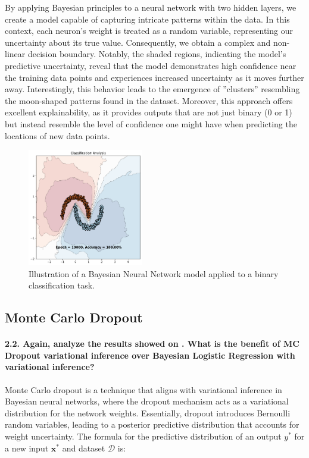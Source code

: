 By applying Bayesian principles to a neural network with two hidden layers, we create a model capable of capturing intricate patterns within the data. In this context, each neuron's weight is treated as a random variable, representing our uncertainty about its true value. Consequently, we obtain a complex and non-linear decision boundary. Notably, the shaded regions, indicating the model's predictive uncertainty, reveal that the model demonstrates high confidence near the training data points and experiences increased uncertainty as it moves further away. Interestingly, this behavior leads to the emergence of ''clusters'' resembling the moon-shaped patterns found in the dataset. Moreover, this approach offers excellent explainability, as it provides outputs that are not just binary (0 or 1) but instead resemble the level of confidence one might have when predicting the locations of new data points.

\begin{figure}[H]
    \centering
    \includegraphics[width=0.45\textwidth]{mlp_variational.pdf}
    \caption{Illustration of a Bayesian Neural Network model applied to a binary classification task.}
    \label{fig:mlp_variational}
\end{figure}

\subsection{Monte Carlo Dropout}
\paragraph{2.2. Again, analyze the results showed on . What is the benefit of MC Dropout variational inference over Bayesian Logistic Regression with variational inference?}

Monte Carlo dropout is a technique that aligns with variational inference in Bayesian neural networks, where the dropout mechanism acts as a variational distribution for the network weights. Essentially, dropout introduces Bernoulli random variables, leading to a posterior predictive distribution that accounts for weight uncertainty. The formula for the predictive distribution of an output $ y^* $ for a new input $ \mathbf{x}^* $ and dataset $ \mathcal{D} $ is:

